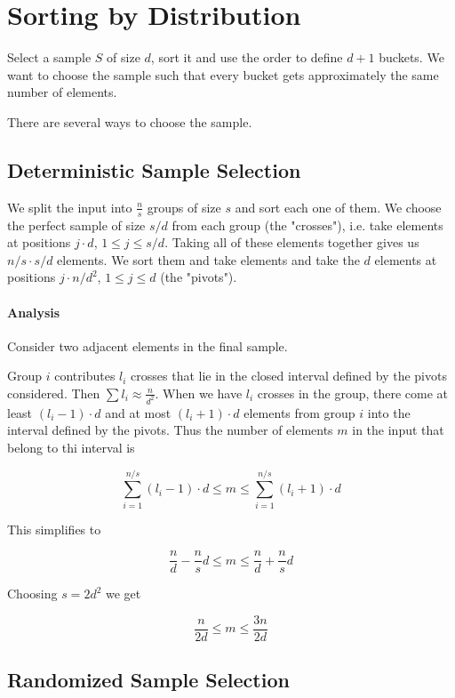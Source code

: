 \section{Sorting by Distribution}

Select a sample $S$ of size $d$, sort it and use the order to define $d+1$ buckets. We want to choose the sample such that every bucket gets approximately the same number of elements.

There are several ways to choose the sample. 

\subsection{Deterministic Sample Selection}

We split the input into $\frac ns$ groups of size $s$ and sort each one of them. We choose the perfect sample of size $s/d$ from each group (the "crosses"), i.e. take elements at positions $j\cdot d$, $1\leq j\leq s/d$. Taking all of these elements together gives us $n/s \cdot s/d$ elements. We sort them and take elements and take the $d$ elements at positions $j\cdot n/d^2$, $1\leq j \leq d$ (the "pivots").

\paragraph{Analysis} Consider two adjacent elements in the final sample. 

Group $i$ contributes $l_i$ crosses that lie in the closed interval defined by the pivots considered. Then $\sum l_i \approx \frac{n}{d^2}$. When we have $l_i$ crosses in the group, there come at least $(l_i - 1)\cdot d$ and at most $(l_i +1) \cdot d$ elements from group $i$ into the interval defined by the pivots. Thus the number of elements $m$ in the input that belong to thi interval is

\[\sum_{i=1}^{n/s} (l_i-1)\cdot d \leq m \leq \sum_{i=1}^{n/s} (l_i+1)\cdot d\]

This simplifies to 

\[\frac nd - \frac ns d \leq m \leq \frac nd + \frac ns d\]

Choosing $s= 2d^2$ we get

\[\frac{n}{2d} \leq m \leq \frac{3n}{2d}\]


\subsection{Randomized Sample Selection}

